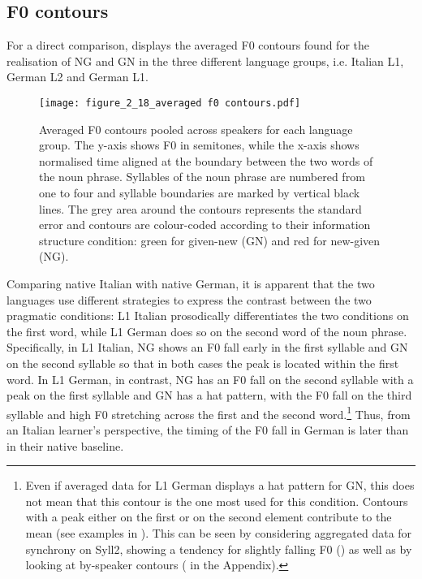 \subsection{F0 contours}
\label{sec:2.7.1}
For a direct comparison,  displays the averaged F0 contours found for the realisation of NG and GN in the three different language groups, i.e. Italian L1, German L2 and German L1.


\begin{figure}
\texttt{[image: figure\_2\_18\_averaged f0 contours.pdf]}%
\caption{Averaged F0 contours pooled across speakers for each language group. The y-axis shows F0 in semitones, while the x-axis shows normalised time aligned at the boundary between the two words of the noun phrase. Syllables of the noun phrase are numbered from one to four and syllable boundaries are marked by vertical black lines. The grey area around the contours represents the standard error and contours are colour-coded according to their information structure condition: green for given-new (GN) and red for new-given (NG).}
\label{fig:2.18}
\end{figure}

Comparing native Italian with native German, it is apparent that the two languages use different strategies to express the contrast between the two pragmatic conditions: L1 Italian prosodically differentiates the two conditions on the first word, while L1 German does so on the second word of the noun phrase. Specifically, in L1 Italian, NG shows an F0 fall early in the first syllable and GN on the second syllable so that in both cases the peak is located within the first word. In L1 German, in contrast, NG has an F0 fall on the second syllable with a peak on the first syllable and GN has a hat pattern, with the F0 fall on the third syllable and high F0 stretching across the first and the second word.\footnote{Even if averaged data for L1 German displays a hat pattern for GN, this does not mean that this contour is the one most used for this condition. Contours with a peak either on the first or on the second element contribute to the mean (see examples in ). This can be seen by considering aggregated data for synchrony on Syll2, showing a tendency for slightly falling F0 () as well as by looking at by-speaker contours ( in the Appendix).} Thus, from an Italian learner’s perspective, the timing of the F0 fall in German is later than in their native baseline.

